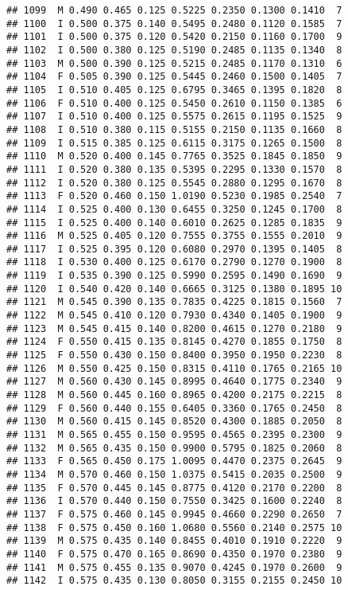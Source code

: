 \documentclass[
]{article}
\begin{document}
\begin{verbatim}
## 1099  M 0.490 0.465 0.125 0.5225 0.2350 0.1300 0.1410  7
## 1100  I 0.500 0.375 0.140 0.5495 0.2480 0.1120 0.1585  7
## 1101  I 0.500 0.375 0.120 0.5420 0.2150 0.1160 0.1700  9
## 1102  I 0.500 0.380 0.125 0.5190 0.2485 0.1135 0.1340  8
## 1103  M 0.500 0.390 0.125 0.5215 0.2485 0.1170 0.1310  6
## 1104  F 0.505 0.390 0.125 0.5445 0.2460 0.1500 0.1405  7
## 1105  I 0.510 0.405 0.125 0.6795 0.3465 0.1395 0.1820  8
## 1106  F 0.510 0.400 0.125 0.5450 0.2610 0.1150 0.1385  6
## 1107  I 0.510 0.400 0.125 0.5575 0.2615 0.1195 0.1525  9
## 1108  I 0.510 0.380 0.115 0.5155 0.2150 0.1135 0.1660  8
## 1109  I 0.515 0.385 0.125 0.6115 0.3175 0.1265 0.1500  8
## 1110  M 0.520 0.400 0.145 0.7765 0.3525 0.1845 0.1850  9
## 1111  I 0.520 0.380 0.135 0.5395 0.2295 0.1330 0.1570  8
## 1112  I 0.520 0.380 0.125 0.5545 0.2880 0.1295 0.1670  8
## 1113  F 0.520 0.460 0.150 1.0190 0.5230 0.1985 0.2540  7
## 1114  I 0.525 0.400 0.130 0.6455 0.3250 0.1245 0.1700  8
## 1115  I 0.525 0.400 0.140 0.6010 0.2625 0.1285 0.1835  9
## 1116  M 0.525 0.405 0.120 0.7555 0.3755 0.1555 0.2010  9
## 1117  I 0.525 0.395 0.120 0.6080 0.2970 0.1395 0.1405  8
## 1118  I 0.530 0.400 0.125 0.6170 0.2790 0.1270 0.1900  8
## 1119  I 0.535 0.390 0.125 0.5990 0.2595 0.1490 0.1690  9
## 1120  I 0.540 0.420 0.140 0.6665 0.3125 0.1380 0.1895 10
## 1121  M 0.545 0.390 0.135 0.7835 0.4225 0.1815 0.1560  7
## 1122  M 0.545 0.410 0.120 0.7930 0.4340 0.1405 0.1900  9
## 1123  M 0.545 0.415 0.140 0.8200 0.4615 0.1270 0.2180  9
## 1124  F 0.550 0.415 0.135 0.8145 0.4270 0.1855 0.1750  8
## 1125  F 0.550 0.430 0.150 0.8400 0.3950 0.1950 0.2230  8
## 1126  M 0.550 0.425 0.150 0.8315 0.4110 0.1765 0.2165 10
## 1127  M 0.560 0.430 0.145 0.8995 0.4640 0.1775 0.2340  9
## 1128  M 0.560 0.445 0.160 0.8965 0.4200 0.2175 0.2215  8
## 1129  F 0.560 0.440 0.155 0.6405 0.3360 0.1765 0.2450  8
## 1130  M 0.560 0.415 0.145 0.8520 0.4300 0.1885 0.2050  8
## 1131  M 0.565 0.455 0.150 0.9595 0.4565 0.2395 0.2300  9
## 1132  M 0.565 0.435 0.150 0.9900 0.5795 0.1825 0.2060  8
## 1133  F 0.565 0.450 0.175 1.0095 0.4470 0.2375 0.2645  9
## 1134  M 0.570 0.460 0.150 1.0375 0.5415 0.2035 0.2500  9
## 1135  F 0.570 0.445 0.145 0.8775 0.4120 0.2170 0.2200  8
## 1136  I 0.570 0.440 0.150 0.7550 0.3425 0.1600 0.2240  8
## 1137  F 0.575 0.460 0.145 0.9945 0.4660 0.2290 0.2650  7
## 1138  F 0.575 0.450 0.160 1.0680 0.5560 0.2140 0.2575 10
## 1139  M 0.575 0.435 0.140 0.8455 0.4010 0.1910 0.2220  9
## 1140  F 0.575 0.470 0.165 0.8690 0.4350 0.1970 0.2380  9
## 1141  M 0.575 0.455 0.135 0.9070 0.4245 0.1970 0.2600  9
## 1142  I 0.575 0.435 0.130 0.8050 0.3155 0.2155 0.2450 10

\end{verbatim}
\end{document}
